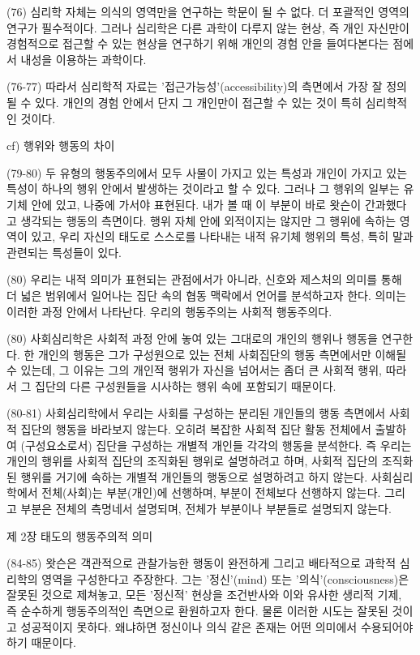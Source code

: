 \documentclass[12pt, a4paper]{article}
\begin{document}
(76) 심리학 자체는 의식의 영역만을 연구하는 학문이 될 수 없다. 더 포괄적인 영역의 연구가 필수적이다. 그러나 심리학은 다른 과학이 다루지 않는 현상, 즉 개인 자신만이 경험적으로 접근할 수 있는 현상을 연구하기 위해 개인의 경험 안을 들여다본다는 점에서 내성을 이용하는 과학이다.

(76-77) 따라서 심리학적 자료는 '접근가능성'(accessibility)의 측면에서 가장 잘 정의될 수 있다. 개인의 경험 안에서 단지 그 개인만이 접근할 수 있는 것이 특히 심리학적인 것이다.

cf) 행위와 행동의 차이

(79-80) 두 유형의 행동주의에서 모두 사물이 가지고 있는 특성과 개인이 가지고 있는 특성이 하나의 행위 안에서 발생하는 것이라고 할 수 있다. 그러나 그 행위의 일부는 유기체 안에 있고, 나중에 가서야 표현된다. 내가 볼 때 이 부분이 바로 왓슨이 간과했다고 생각되는 행동의 측면이다. 행위 자체 안에 외적이지는 않지만 그 행위에 속하는 영역이 있고, 우리 자신의 태도로 스스로를 나타내는 내적 유기체 행위의 특성, 특히 말과 관련되는 특성들이 있다.

(80) 우리는 내적 의미가 표현되는 관점에서가 아니라, 신호와 제스처의 의미를 통해 더 넓은 범위에서 일어나는 집단 속의 협동 맥락에서 언어를 분석하고자 한다. 의미는 이러한 과정 안에서 나타난다. 우리의 행동주의는 사회적 행동주의다.

(80) 사회심리학은 사회적 과정 안에 놓여 있는 그대로의 개인의 행위나 행동을 연구한다. 한 개인의 행동은 그가 구성원으로 있는 전체 사회집단의 행동 측면에서만 이해될 수 있는데, 그 이유는 그의 개인적 행위가 자신을 넘어서는 좀더 큰 사회적 행위, 따라서 그 집단의 다른 구성원들을 시사하는 행위 속에 포함되기 때문이다.

(80-81) 사회심리학에서 우리는 사회를 구성하는 분리된 개인들의 행동 측면에서 사회적 집단의 행동을 바라보지 않는다. 오히려 복잡한 사회적 집단 활동 전체에서 출발하여 (구성요소로서) 집단을 구성하는 개별적 개인들 각각의 행동을 분석한다. 즉 우리는 개인의 행위를 사회적 집단의 조직화된 행위로 설명하려고 하며, 사회적 집단의 조직화된 행위를 거기에 속하는 개별적 개인들의 행동으로 설명하려고 하지 않는다. 사회심리학에서 전체(사회)는 부분(개인)에 선행하며, 부분이 전체보다 선행하지 않는다. 그리고 부분은 전체의 측명네서 설명되며, 전체가 부분이나 부분들로 설명되지 않는다. 


제 2장 태도의 행동주의적 의미

(84-85) 왓슨은 객관적으로 관찰가능한 행동이 완전하게 그리고 배타적으로 과학적 심리학의 영역을 구성한다고 주장한다. 그는 '정신'(mind) 또는 '의식'(consciousness)은 잘못된 것으로 제쳐놓고, 모든 '정신적' 현상을 조건반사와 이와 유사한 생리적 기제, 즉 순수하게 행동주의적인 측면으로 환원하고자 한다. 물론 이러한 시도는 잘못된 것이고 성공적이지 못하다. 왜냐하면 정신이나 의식 같은 존재는 어떤 의미에서 수용되어야 하기 때문이다.
\end{document}
